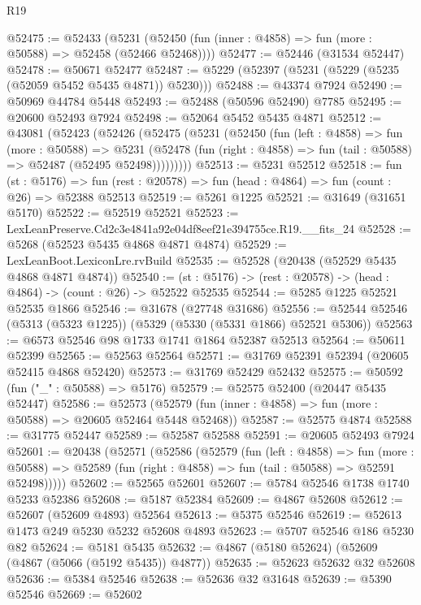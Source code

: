 \begin{lexlean}{R19}
\begin{coremodule}
@52475 := @52433
    (@5231 (@52450 (fun (inner : @4858) => fun (more : @50588) => @52458 (@52466 @52468))))
@52477 := @52446 (@31534 @52447)
@52478 := @50671 @52477
@52487 := @5229 (@52397 (@5231 (@5229 (@5235 (@52059 @5452 @5435 @4871)) @5230)))
@52488 := @43374 @7924
@52490 := @50969 @44784 @5448
@52493 := @52488 (@50596 @52490) @7785
@52495 := @20600 @52493 @7924
@52498 := @52064 @5452 @5435 @4871
@52512 := @43081
    (@52423
      (@52426
        (@52475
          (@5231
            (@52450
              (fun (left : @4858) =>
              fun (more : @50588) =>
              @5231
                (@52478
                  (fun (right : @4858) => fun (tail : @50588) => @52487 (@52495 @52498)))))))))
@52513 := @5231 @52512
@52518 := fun (st : @5176) =>
  fun (rest : @20578) => fun (head : @4864) => fun (count : @26) => @52388 @52513
@52519 := @5261 @1225
@52521 := @31649 (@31651 @5170)
@52522 := @52519 @52521
@52523 := LexLeanPreserve.Cd2c3e4841a92e04df8eef21e394755ce.R19.__fits_24
@52528 := @5268 (@52523 @5435 @4868 @4871 @4874)
@52529 := LexLeanBoot.LexiconLre.rvBuild
@52535 := @52528 (@20438 (@52529 @5435 @4868 @4871 @4874))
@52540 := (st : @5176) -> (rest : @20578) -> (head : @4864) -> (count : @26) -> @52522 @52535
@52544 := @5285 @1225 @52521 @52535 @1866
@52546 := @31678 (@27748 @31686)
@52556 := @52544 @52546 (@5313 (@5323 @1225)) (@5329 (@5330 (@5331 @1866) @52521 @5306))
@52563 := @6573 @52546 @98 @1733 @1741 @1864 @52387 @52513
@52564 := @50611 @52399
@52565 := @52563 @52564
@52571 := @31769 @52391 @52394 (@20605 @52415 @4868 @52420)
@52573 := @31769 @52429 @52432
@52575 := @50592 (fun ("_" : @50588) => @5176)
@52579 := @52575 @52400 (@20447 @5435 @52447)
@52586 := @52573 (@52579 (fun (inner : @4858) => fun (more : @50588) => @20605 @52464 @5448 @52468))
@52587 := @52575 @4874
@52588 := @31775 @52447
@52589 := @52587 @52588
@52591 := @20605 @52493 @7924
@52601 := @20438
    (@52571
      (@52586
        (@52579
          (fun (left : @4858) =>
          fun (more : @50588) =>
          @52589 (fun (right : @4858) => fun (tail : @50588) => @52591 @52498)))))
@52602 := @52565 @52601
@52607 := @5784 @52546 @1738 @1740 @5233 @52386
@52608 := @5187 @52384
@52609 := @4867 @52608
@52612 := @52607 (@52609 @4893) @52564
@52613 := @5375 @52546
@52619 := @52613 @1473 @249 @5230 @5232 @52608 @4893
@52623 := @5707 @52546 @186 @5230 @82
@52624 := @5181 @5435
@52632 := @4867 (@5180 @52624) (@52609 (@4867 (@5066 (@5192 @5435)) @4877))
@52635 := @52623 @52632 @32 @52608
@52636 := @5384 @52546
@52638 := @52636 @32 @31648
@52639 := @5390 @52546
@52669 := @52602

\end{coremodule}
\end{lexlean}
